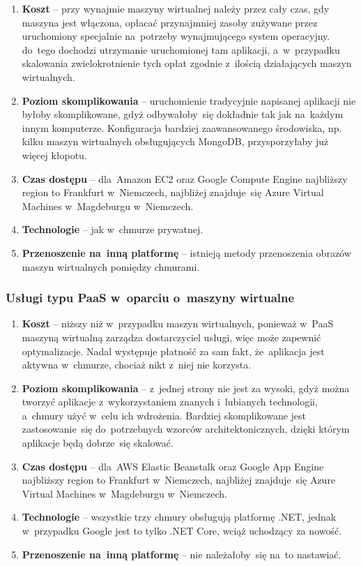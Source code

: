 \documentclass[12pt,a4paper,twoside,titlepage,openright]{book}
\begin{document}
\begin{enumerate}
	\item \textbf{Koszt} -- przy wynajmie maszyny wirtualnej należy przez cały czas, gdy maszyna jest włączona, opłacać przynajmniej zasoby zużywane przez uruchomiony specjalnie na~potrzeby wynajmującego system operacyjny. do~tego dochodzi utrzymanie uruchomionej tam aplikacji, a~w~przypadku skalowania zwielokrotnienie tych opłat zgodnie z~ilością działających maszyn wirtualnych.
	\item \textbf{Poziom skomplikowania} -- uruchomienie tradycyjnie napisanej aplikacji nie byłoby skomplikowane, gdyż odbywałoby~się dokładnie tak jak na~każdym innym komputerze. Konfiguracja bardziej zaawansowanego środowiska, np. kilku maszyn wirtualnych obsługujących MongoDB, przysporzyłaby już więcej kłopotu.
	\item \textbf{Czas dostępu} -- dla~Amazon EC2 oraz Google Compute Engine najbliższy region to Frankfurt w~Niemczech, najbliżej znajduje~się Azure Virtual Machines w~Magdeburgu w~Niemczech.
	\item \textbf{Technologie} -- jak w~chmurze prywatnej.
	\item \textbf{Przenoszenie na~inną platformę} -- istnieją metody przenoszenia obrazów maszyn wirtualnych pomiędzy chmurami.
\end{enumerate}


\subsubsection{Usługi typu PaaS w~oparciu o~maszyny wirtualne}

\begin{enumerate}
	\item \textbf{Koszt} -- niższy niż w~przypadku maszyn wirtualnych, ponieważ w~PaaS maszyną wirtualną zarządza dostarczyciel usługi, więc może zapewnić optymalizacje. Nadal występuje płatność za sam fakt, że~aplikacja jest aktywna w~chmurze, chociaż nikt z~niej nie korzysta.
	\item \textbf{Poziom skomplikowania} -- z~jednej strony nie jest za wysoki, gdyż można tworzyć aplikacje z~wykorzystaniem znanych i~lubianych technologii, a~chmury użyć w~celu ich wdrożenia. Bardziej skomplikowane jest zastosowanie~się do~potrzebnych wzorców architektonicznych, dzięki którym aplikacje będą dobrze~się skalować.
	\item \textbf{Czas dostępu} -- dla~AWS Elastic Beanstalk oraz Google App Engine najbliższy region to Frankfurt w~Niemczech, najbliżej znajduje~się Azure Virtual Machines w~Magdeburgu w~Niemczech.
	\item \textbf{Technologie} -- wszystkie trzy chmury obsługują platformę .NET, jednak w~przypadku Google jest to tylko .NET Core, wciąż uchodzący za nowość.
	\item \textbf{Przenoszenie na~inną platformę} -- nie należałoby~się na~to nastawiać.
\end{enumerate}
\end{document}
